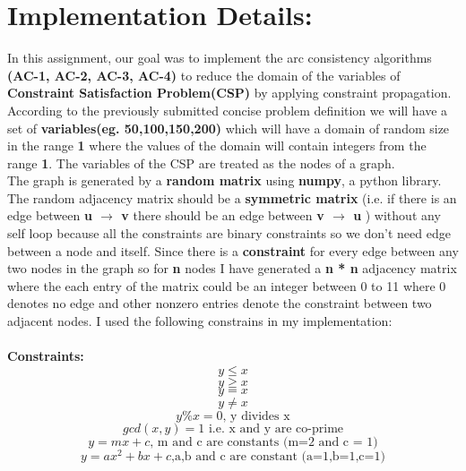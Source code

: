 \documentclass[12pt , conference]{IEEEtran}
\begin{document}
		\section{Implementation Details:}
	In this assignment, our goal was to implement the arc consistency algorithms \textbf{(AC-1, AC-2, AC-3, AC-4)} to reduce the domain of the variables of \textbf{Constraint Satisfaction Problem(CSP)} by applying constraint propagation.\\
	According to the previously submitted concise problem definition we will have a set of \textbf{variables(eg. 50,100,150,200)} which will have a domain of random size in the range \textbf{1} where the values of the domain will contain integers from the range \textbf{1}. The variables of the CSP are treated as the nodes of a graph.\\The graph is generated by a \textbf{random matrix} using \textbf{numpy}, a python library. The random adjacency matrix should be a \textbf{symmetric matrix} (i.e. if there is an edge between \textbf{u $\rightarrow$ v} there should be an edge between \textbf{v $\rightarrow$ u} ) without any self loop because all the constraints are binary constraints so we don't need edge between a node and itself. Since there is a \textbf{constraint} for every edge between  any two nodes in the graph so for \textbf{n} nodes I have generated a \textbf{n * n} adjacency matrix where the each entry of the matrix could be an integer between 0 to 11 where 0 denotes no edge and other nonzero entries denote the constraint between two adjacent nodes. I used the following constrains in my implementation:\\\\\textbf{Constraints:}
	\begin{equation}
	y \leq x
	\end{equation}
	\begin{equation}
	y \geq x
	\end{equation}
	\begin{equation}
	y=x
	\end{equation}
	\begin{equation}
	y \neq x
	\end{equation}
	\begin{equation}
	y\%x=0 \mbox{, y divides x}
	\end{equation}
	\begin{equation}
	gcd(x,y)=1 \mbox{ i.e. x and y are co-prime}
	\end{equation}
	\begin{equation}
	y=mx + c \mbox{, m and c are constants (m=2 and c = 1)}
	\end{equation}
	\begin{equation}
	y=ax^2 + bx + c \mbox{,a,b and c are constant (a=1,b=1,c=1)}
	\end{equation}
	
\end{document}
